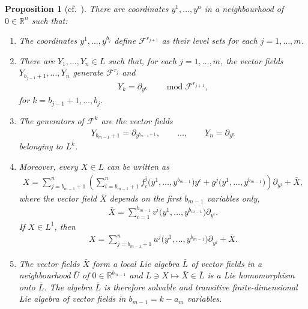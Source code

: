 \documentclass[11pt]{article}
\numberwithin{equation}{section}
\numberwithin{equation}{section}
\newtheorem{Proposition}[Theorem]{Proposition}
 { \theoremstyle{definition}
\newtheorem{Definition}[Theorem]{Definition}
\newtheorem{Example}[Theorem]{Example}
\newtheorem{Remark}[Theorem]{Remark} }
\begin{document}
\begin{Proposition}[cf.~\cite{CFG16, CFGR15}]\label{p1}
There are coordinates $y^1,\dots,y^n$ in a neighbourhood of $0\in{\mathbb R}^n$ such that:
\begin{enumerate}\itemsep=0pt
\item[$1.$] The coordinates $y^1,\dots, y^{b_j}$ define ${\mathcal F}^{r_{j+1}}$ as their level sets for each $j=1,\dots,m$.
\item[$2.$] There are $Y_1,\dots,Y_n\in L$ such that, for each $j=1,\dots,m$, the vector fields $Y_{b_{j-1}+1},\dots,Y_n$ generate ${\mathcal F}^{r_j}$ and
\begin{gather}\label{gen} Y_k=\partial_{y^k} \qquad \operatorname{mod}{\mathcal F}^{r_{j+1}} ,\end{gather}
for $k=b_{j-1}+1,\dots,b_j$.
\item[$3.$] The generators of ${\mathcal F}^k$ are the vector fields
\begin{gather}\label{fine} Y_{b_{m-1}+1}=\partial_{y^{b_{m-1}+1}} ,\qquad \dots,\qquad Y_n=\partial_{y^n}\end{gather}
belonging to $L^k$.
\item[$4.$] Moreover, every $X\in L$ can be written as
\begin{gather}\label{form}X=\sum_{j=b_{m-1}+1}^n\left(\sum_{i=b_{m-1}+1}^n f_i^j\big(y^1,\dots,y^{b_{m-1}}\big)y^i+g^j\big(y^1,\dots,y^{b_{m-1}}\big)\right)\partial_{y^j}
+\bar{X} ,
\end{gather}
where the vector field $\bar{X}$ depends on the first $b_{m-1}$ variables only,
\begin{gather*}%
\bar{X}=\sum_{i=1}^{b_{m-1}}v^i\big(y^1,\dots,y^{b_{m-1}}\big)\partial_{y^i} .\end{gather*}
If $X\in L^1$, then
\begin{gather*}%
X=\sum_{j=b_{m-1}+1}^nu^j\big(y^1,\dots,y^{b_{m-1}}\big)\partial_{y^j}
+\bar{X} .
\end{gather*}

\item[$5.$] The vector fields $\bar{X}$ form a local Lie algebra $\bar{L}$ of vector fields in a neighbourhood $\bar{U}$
of $0\in{\mathbb R}^{b_{m-1}}$ and $L\ni X\mapsto \bar{X}\in\overline{L}$ is a Lie homomorphism onto $\bar{L}$. The algebra $\bar{L}$ is therefore solvable and transitive finite-dimensional Lie algebra of vector fields in $b_{m-1}=k-a_m$ variables.
\end{enumerate}
\end{Proposition}
\end{document}

